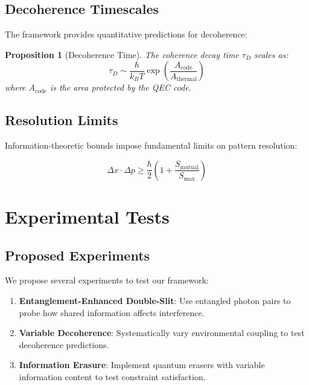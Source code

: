 \documentclass[12pt,a4paper]{article}
\newtheorem{proposition}[theorem]{Proposition}
\begin{document}
\subsection{Decoherence Timescales}

The framework provides quantitative predictions for decoherence:

\begin{proposition}[Decoherence Time]
The coherence decay time $\tau_D$ scales as:
\begin{equation}
\tau_D \sim \frac{\hbar}{k_B T} \exp\left(\frac{A_{\text{code}}}{A_{\text{thermal}}}\right)
\end{equation}
where $A_{\text{code}}$ is the area protected by the QEC code.
\end{proposition}

\subsection{Resolution Limits}

Information-theoretic bounds impose fundamental limits on pattern resolution:

\begin{equation}
\Delta x \cdot \Delta p \geq \frac{\hbar}{2} \left(1 + \frac{S_{\text{mutual}}}{S_{\text{max}}}\right)
\end{equation}

\section{Experimental Tests}

\subsection{Proposed Experiments}

We propose several experiments to test our framework:

\begin{enumerate}
\item \textbf{Entanglement-Enhanced Double-Slit}: Use entangled photon pairs to probe how shared information affects interference.

\item \textbf{Variable Decoherence}: Systematically vary environmental coupling to test decoherence predictions.

\item \textbf{Information Erasure}: Implement quantum erasers with variable information content to test constraint satisfaction.
\end{enumerate}
\end{document}
